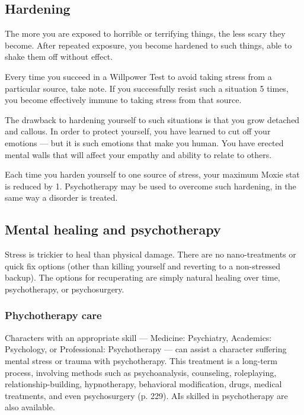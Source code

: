 \subsection{Hardening}
\label{sec:hardening}

The more you are exposed to horrible or terrifying things, the less scary they become. After repeated exposure, you become hardened to such things, able to shake them off without effect.

Every time you succeed in a Willpower Test to avoid taking stress from a particular source, take note. If you successfully resist such a situation 5 times, you become effectively immune to taking stress from that source.

The drawback to hardening yourself to such situations is that you grow detached and callous. In order to protect yourself, you have learned to cut off your emotions --- but it is such emotions that make you human. You have erected mental walls that will affect your empathy and ability to relate to others.

Each time you harden yourself to one source of stress, your maximum Moxie stat is reduced by 1. Psychotherapy may be used to overcome such hardening, in the same way a disorder is treated.


\subsection{Mental healing and psychotherapy}
\label{sec:mental-healing-psychotherapy}

Stress is trickier to heal than physical damage. There are no nano-treatments or quick fix options (other than killing yourself and reverting to a non-stressed backup). The options for recuperating are simply natural healing over time, psychotherapy, or psychosurgery.

\subsubsection{Phychotherapy care}

Characters with an appropriate skill ---  Medicine: Psychiatry, Academics: Psychology, or Professional: Psychotherapy --- can assist a character suffering mental stress or trauma with psychotherapy. This treatment is a long-term process, involving methods such as psychoanalysis, counseling, roleplaying, relationship-building, hypnotherapy, behavioral modification, drugs, medical treatments, and even psychosurgery (p. 229). AIs skilled in psychotherapy are also available.

